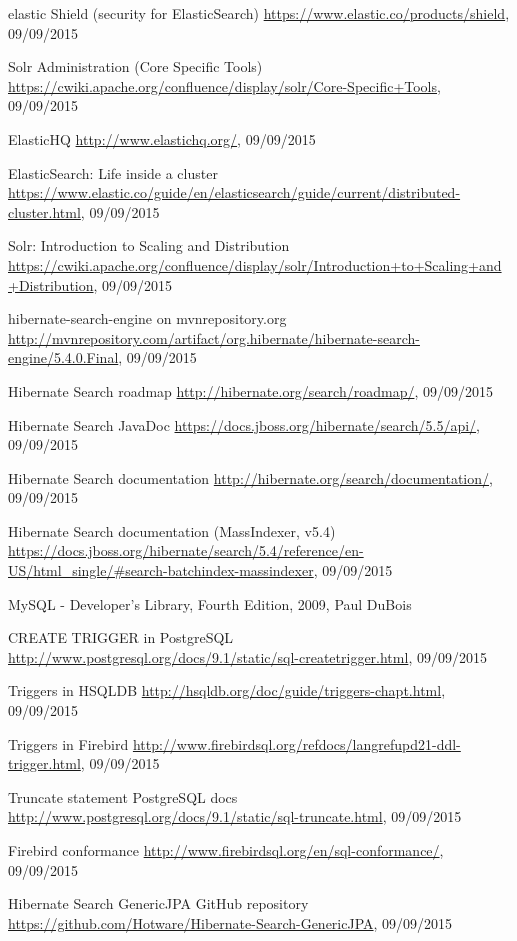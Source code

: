 \begin{thebibliography}{100}
	 elastic Shield (security for ElasticSearch)
	\url{https://www.elastic.co/products/shield}, 09/09/2015
	
	 Solr Administration (Core Specific Tools)
	\url{https://cwiki.apache.org/confluence/display/solr/Core-Specific+Tools}, 09/09/2015
	
	 ElasticHQ
	\url{http://www.elastichq.org/}, 09/09/2015
	
	 ElasticSearch: Life inside a cluster
	\url{https://www.elastic.co/guide/en/elasticsearch/guide/current/distributed-cluster.html}, 09/09/2015
	
	 Solr: Introduction to Scaling and Distribution
	\url{https://cwiki.apache.org/confluence/display/solr/Introduction+to+Scaling+and+Distribution}, 09/09/2015
	
	 hibernate-search-engine on mvnrepository.org
	\url{http://mvnrepository.com/artifact/org.hibernate/hibernate-search-engine/5.4.0.Final}, 09/09/2015
	
	 Hibernate Search roadmap
	\url{http://hibernate.org/search/roadmap/}, 09/09/2015
	
	 Hibernate Search JavaDoc
	\url{https://docs.jboss.org/hibernate/search/5.5/api/}, 09/09/2015
	
	 Hibernate Search documentation
	\url{http://hibernate.org/search/documentation/}, 09/09/2015
	
	 Hibernate Search documentation (MassIndexer, v5.4)
	\url{https://docs.jboss.org/hibernate/search/5.4/reference/en-US/html_single/#search-batchindex-massindexer}, 09/09/2015
	
	 MySQL - Developer's Library, Fourth Edition, 2009, Paul DuBois
	
	 CREATE TRIGGER in PostgreSQL
	\url{http://www.postgresql.org/docs/9.1/static/sql-createtrigger.html}, 09/09/2015
	
	 Triggers in HSQLDB
	\url{http://hsqldb.org/doc/guide/triggers-chapt.html}, 09/09/2015
	
	 Triggers in Firebird
	\url{http://www.firebirdsql.org/refdocs/langrefupd21-ddl-trigger.html}, 09/09/2015
	
	 Truncate statement PostgreSQL docs
	\url{http://www.postgresql.org/docs/9.1/static/sql-truncate.html}, 09/09/2015
	
	 Firebird conformance
	\url{http://www.firebirdsql.org/en/sql-conformance/}, 09/09/2015
	
	 Hibernate Search GenericJPA GitHub repository
	\url{https://github.com/Hotware/Hibernate-Search-GenericJPA}, 09/09/2015
	
	
\end{thebibliography}

\pagebreak
~
